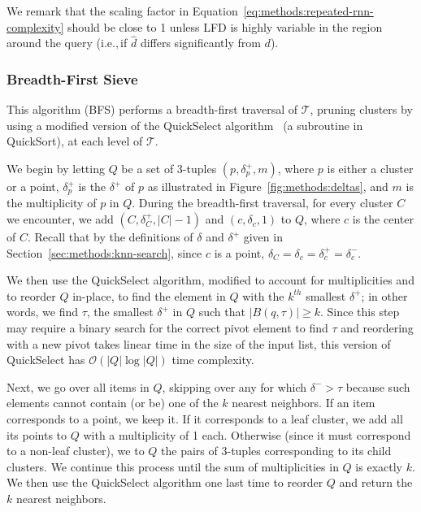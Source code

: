 We remark that the scaling factor in Equation~\ref{eq:methods:repeated-rnn-complexity} should be close to 1 unless LFD is highly variable in the region around the query (i.e.,\,if $\hat{d}$ differs significantly from $d$).


\subsubsection{Breadth-First Sieve}
\label{sec:methods:knn-search:bredth-first-sieve}

This algorithm (BFS) performs a breadth-first traversal of $\mathcal{T}$, pruning clusters by using a modified version of the QuickSelect algorithm~\cite{hoare1961algorithm} (a subroutine in QuickSort), at each level of $\mathcal{T}$.

We begin by letting $Q$ be a set of 3-tuples $(p, \delta^{+}_{p}, m)$, where $p$ is either a cluster or a point, $\delta^{+}_{p}$ is the $\delta^{+}$ of $p$ as illustrated in Figure~\ref{fig:methods:deltas}, and $m$ is the multiplicity of $p$ in $Q$.
During the breadth-first traversal, for every cluster $C$ we encounter, we add $(C, \delta^{+}_{C}, |C| - 1)$ and $(c, \delta_{c}, 1)$ to $Q$, where $c$ is the center of $C$.
Recall that by the definitions of $\delta$ and $\delta^{+}$ given in Section~\ref{sec:methods:knn-search}, since $c$ is a point, $\delta_{C} = \delta_{c} = \delta^{+}_{c} = \delta^{-}_{c}$.

We then use the QuickSelect algorithm, modified to account for multiplicities and to reorder $Q$ in-place, to find the element in $Q$ with the $k^{th}$ smallest $\delta^{+}$; in other words, we find $\tau$, the smallest $\delta^{+}$ in $Q$ such that $\left| B(q, \tau) \right| \geq k$.
Since this step may require a binary search for the correct pivot element to find $\tau$ and reordering with a new pivot takes linear time in the size of the input list, this version of QuickSelect has $\mathcal{O}\left(|Q| \log |Q|\right)$ time complexity.

Next, we go over all items in $Q$, skipping over any for which $\delta^{-} > \tau$ because such elements cannot contain (or be) one of the $k$ nearest neighbors.
If an item corresponds to a point, we keep it.
If it corresponds to a leaf cluster, we add all its points to $Q$ with a multiplicity of 1 each.
Otherwise (since it must correspond to a non-leaf cluster), we to $Q$ the pairs of 3-tuples corresponding to its child clusters.
We continue this process until the sum of multiplicities in $Q$ is exactly $k$.
We then use the QuickSelect algorithm one last time to reorder $Q$ and return the $k$ nearest neighbors.


